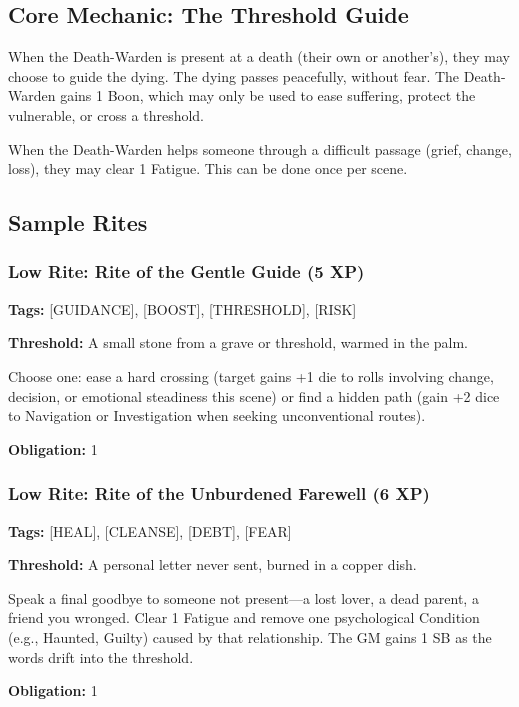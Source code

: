 \subsection{Core Mechanic: The Threshold Guide}

When the Death-Warden is present at a death (their own or another's), they may choose to guide the dying. The dying passes peacefully, without fear. The Death-Warden gains 1 Boon, which may only be used to ease suffering, protect the vulnerable, or cross a threshold.

When the Death-Warden helps someone through a difficult passage (grief, change, loss), they may clear 1 Fatigue. This can be done once per scene.

\subsection{Sample Rites}

\subsubsection{Low Rite: Rite of the Gentle Guide (5 XP)}

\textbf{Tags:} [GUIDANCE], [BOOST], [THRESHOLD], [RISK]

\textbf{Threshold:} A small stone from a grave or threshold, warmed in the palm.

Choose one: ease a hard crossing (target gains +1 die to rolls involving change, decision, or emotional steadiness this scene) or find a hidden path (gain +2 dice to Navigation or Investigation when seeking unconventional routes).

\textbf{Obligation:} 1

\subsubsection{Low Rite: Rite of the Unburdened Farewell (6 XP)}

\textbf{Tags:} [HEAL], [CLEANSE], [DEBT], [FEAR]

\textbf{Threshold:} A personal letter never sent, burned in a copper dish.

Speak a final goodbye to someone not present—a lost lover, a dead parent, a friend you wronged. Clear 1 Fatigue and remove one psychological Condition (e.g., Haunted, Guilty) caused by that relationship. The GM gains 1 SB as the words drift into the threshold.

\textbf{Obligation:} 1

